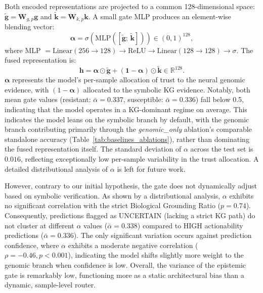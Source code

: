 \documentclass[conference]{IEEEtran}
\begin{document}
Both encoded representations are projected to a common 128-dimensional space: $\tilde{\mathbf{g}} = \mathbf{W}_{g,p}\mathbf{g}$ and $\tilde{\mathbf{k}} = \mathbf{W}_{k,p}\mathbf{k}$. A small gate MLP produces an element-wise blending vector:
\begin{equation}
  \boldsymbol{\alpha} = \sigma\!\left(\text{MLP}\!\left(
    [\tilde{\mathbf{g}};\,\tilde{\mathbf{k}}]\right)\right) \in (0,1)^{128},
\end{equation}
where MLP $= \text{Linear}(256{\to}128) \to \text{ReLU} \to \text{Linear}(128{\to}128) \to \sigma$. The fused representation is:
\begin{equation}
  \mathbf{h} = \boldsymbol{\alpha} \odot \tilde{\mathbf{g}}
             + (\mathbf{1}-\boldsymbol{\alpha}) \odot \tilde{\mathbf{k}}
    \in \mathbb{R}^{128}.
\end{equation}
$\boldsymbol{\alpha}$ represents the model's per-sample allocation of trust to the neural genomic evidence, with $(1-\boldsymbol{\alpha})$ allocated to the symbolic KG evidence. Notably, both mean gate values (resistant: $\bar{\alpha} = 0.337$, susceptible: $\bar{\alpha} = 0.336$) fall below 0.5, indicating that the model operates in a KG-dominant regime on average. This indicates the model leans on the symbolic branch by default, with the genomic branch contributing primarily through the \textit{genomic\_only} ablation's comparable standalone accuracy (Table~\ref{tab:baselines_ablations}), rather than dominating the fused representation itself. The standard deviation of $\alpha$ across the test set is $0.016$, reflecting exceptionally low per-sample variability in the trust allocation. A detailed distributional analysis of $\alpha$ is left for future work.

However, contrary to our initial hypothesis, the gate does not dynamically adjust based on symbolic verification. As shown by a distributional analysis, $\alpha$ exhibits no significant correlation with the strict Biological Grounding Ratio ($p=0.74$). Consequently, predictions flagged as UNCERTAIN (lacking a strict KG path) do not cluster at different $\alpha$ values ($\bar{\alpha}=0.338$) compared to HIGH actionability predictions ($\bar{\alpha}=0.336$). The only significant variation occurs against prediction confidence, where $\alpha$ exhibits a moderate negative correlation ($\rho=-0.46, p<0.001$), indicating the model shifts slightly more weight to the genomic branch when confidence is low. Overall, the variance of the epistemic gate is remarkably low, functioning more as a static architectural bias than a dynamic, sample-level router.
\end{document}
